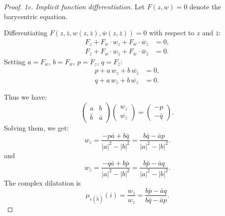 \begin{proof}
	\medskip
	\noindent\textit{1c. Implicit function differentiation.}
	Let $F(z, w) = 0$ denote the barycentric equation.
	
	Differentiating $F(z, \bar{z}, w(z,\bar{z}), \bar{w}(z,\bar{z})) = 0$ with respect to $z$ and $\bar{z}$:
	\begin{align}
		F_z + F_w \cdot w_z + F_{\bar{w}} \cdot \bar{w}_z &= 0, \label{eq:wirt-z}\\
		F_{\bar{z}} + F_w \cdot w_{\bar{z}} + F_{\bar{w}} \cdot \bar{w}_{\bar{z}} &= 0. \label{eq:wirt-zbar}
	\end{align}
	Setting $a = F_w$, $b = F_{\bar{w}}$, $p = F_z$, $q = F_{\bar{z}}$:
	\begin{align}
		p + a\,w_z + b\,\overline{w_{\bar{z}}} &= 0, \tag{I}\\
		q + a\,w_{\bar{z}} + b\,\overline{w_z} &= 0. \tag{II}
	\end{align}
	
	Thus we have:
	\[
	\begin{pmatrix} a & b \\ \bar{b} & \bar{a} \end{pmatrix} \begin{pmatrix} w_z \\ \overline{w_{\bar{z}}} \end{pmatrix} = \begin{pmatrix} -p \\ -\bar{q} \end{pmatrix}.
	\]
	Solving them, we get:
	\[
	w_z = \frac{-p\bar{a} + b\bar{q}}{|a|^2 - |b|^2} = \frac{b\bar{q} - \bar{a}p}{|a|^2 - |b|^2}.
	\]
	and
	\[
	w_{\bar{z}} = \frac{-q\bar{a} + b\bar{p}}{|a|^2 - |b|^2} = \frac{b\bar{p} - \bar{a}q}{|a|^2 - |b|^2}.
	\]
	The complex dilatation is 
	\begin{equation}\label{eq:mu-ratio}
		\mu_{e(\tilde{h})}(i) = \frac{w_{\bar{z}}}{w_z} = \frac{b\bar{p} - \bar{a}q}{b\bar{q} - \bar{a}p}.
	\end{equation}
	

\end{proof}
